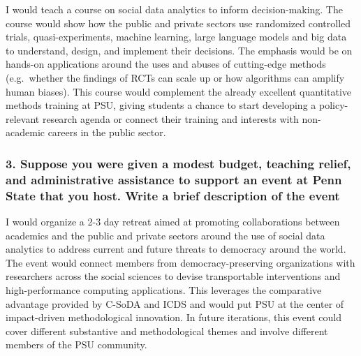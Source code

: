 \documentclass[
  12pt,
  letterpaper,
  DIV=11,
  numbers=noendperiod]{scrartcl}
\begin{document}
I would teach a course on social data analytics to inform
decision-making. The course would show how the public and private
sectors use randomized controlled trials, quasi-experiments, machine
learning, large language models and big data to understand, design, and
implement their decisions. The emphasis would be on hands-on
applications around the uses and abuses of cutting-edge methods
(e.g.~whether the findings of RCTs can scale up or how algorithms can
amplify human biases). This course would complement the already
excellent quantitative methods training at PSU, giving students a chance
to start developing a policy-relevant research agenda or connect their
training and interests with non-academic careers in the public sector.

\hypertarget{suppose-you-were-given-a-modest-budget-teaching-relief-and-administrative-assistance-to-support-an-event-at-penn-state-that-you-host.-write-a-brief-description-of-the-event}{%
\subsubsection{3. Suppose you were given a modest budget, teaching
relief, and administrative assistance to support an event at Penn State
that you host. Write a brief description of the
event}\label{suppose-you-were-given-a-modest-budget-teaching-relief-and-administrative-assistance-to-support-an-event-at-penn-state-that-you-host.-write-a-brief-description-of-the-event}}

I would organize a 2-3 day retreat aimed at promoting collaborations
between academics and the public and private sectors around the use of
social data analytics to address current and future threats to democracy
around the world. The event would connect members from
democracy-preserving organizations with researchers across the social
sciences to devise transportable interventions and high-performance
computing applications. This leverages the comparative advantage
provided by C-SoDA and ICDS and would put PSU at the center of
impact-driven methodological innovation. In future iterations, this
event could cover different substantive and methodological themes and
involve different members of the PSU community.
\end{document}
